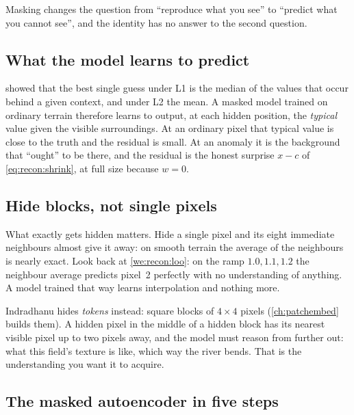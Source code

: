 \begin{keypoint}
Masking changes the question from ``reproduce what you see'' to ``predict what you cannot see'', and
the identity has no answer to the second question.
\end{keypoint}

\subsection{What the model learns to predict}

 showed that the best single guess under L1 is the median of the values that
occur behind a given context, and under L2 the mean. A masked model trained on ordinary terrain
therefore learns to output, at each hidden position, the \emph{typical} value given the visible
surroundings. At an ordinary pixel that typical value is close to the truth and the residual is small.
At an anomaly it is the background that ``ought'' to be there, and the residual is the honest surprise
$x-c$ of \cref{eq:recon:shrink}, at full size because $w=0$.

\subsection{Hide blocks, not single pixels}

What exactly gets hidden matters. Hide a single pixel and its eight immediate neighbours almost give it
away: on smooth terrain the average of the neighbours is nearly exact. Look back at
\cref{we:recon:loo}: on the ramp $1.0,1.1,1.2$ the neighbour average predicts pixel~2 perfectly with
no understanding of anything. A model trained that way learns interpolation and nothing more.

Indradhanu hides \emph{tokens} instead: square blocks of $4\times4$ pixels (\cref{ch:patchembed}
builds them). A hidden pixel in the middle of a hidden block has its nearest visible pixel up to two
pixels away, and the model must reason from further out: what this field's texture is like, which way
the river bends. That is the understanding you want it to acquire.

\subsection{The masked autoencoder in five steps}

